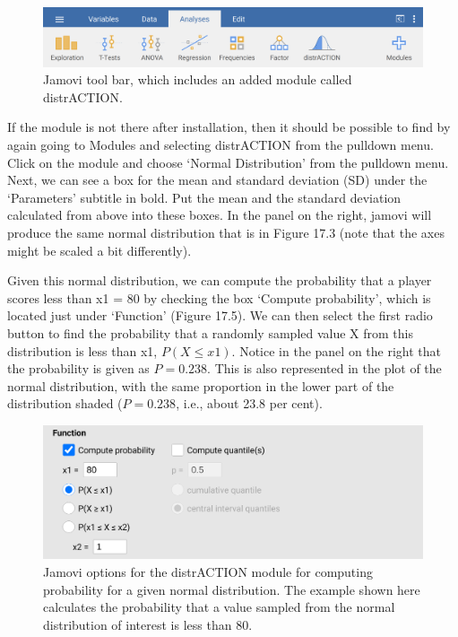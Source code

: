 \documentclass[
  openany]{scrbook}
\begin{document}
\begin{figure}
\includegraphics[width=1\linewidth]{img/jamovi_toolbar_modules_distrACTION} \caption{Jamovi tool bar, which includes an added module called distrACTION.}\label{fig:unnamed-chunk-68}
\end{figure}

If the module is not there after installation, then it should be possible to find by again going to Modules and selecting distrACTION from the pulldown menu.
Click on the module and choose `Normal Distribution' from the pulldown menu.
Next, we can see a box for the mean and standard deviation (SD) under the `Parameters' subtitle in bold.
Put the mean and the standard deviation calculated from above into these boxes.
In the panel on the right, jamovi will produce the same normal distribution that is in Figure 17.3 (note that the axes might be scaled a bit differently).

Given this normal distribution, we can compute the probability that a player scores less than x1 = 80 by checking the box `Compute probability', which is located just under `Function' (Figure 17.5).
We can then select the first radio button to find the probability that a randomly sampled value X from this distribution is less than x1, \(P(X \leq x1)\).
Notice in the panel on the right that the probability is given as \(P = 0.238\).
This is also represented in the plot of the normal distribution, with the same proportion in the lower part of the distribution shaded (\(P = 0.238\), i.e., about 23.8 per cent).

\begin{figure}
\includegraphics[width=0.8\linewidth]{img/jamovi_normal_distribution} \caption{Jamovi options for the distrACTION module for computing probability for a given normal distribution. The example shown here calculates the probability that a value sampled from the normal distribution of interest is less than 80.}\label{fig:unnamed-chunk-69}
\end{figure}
\end{document}
